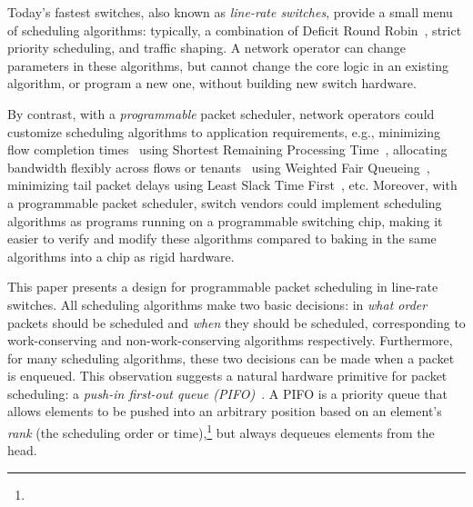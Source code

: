 
Today's fastest switches, also known as \textit{line-rate switches},
provide a small menu of scheduling algorithms: typically, a
combination of Deficit Round Robin~\cite{drr}, strict priority
scheduling, and traffic shaping. A network operator can change
parameters in these algorithms, but cannot change the core logic in an
existing algorithm, or program a new one, without building new switch
hardware.

By contrast, with a {\em programmable} packet scheduler, network
operators could customize scheduling algorithms to application
requirements, e.g., minimizing flow completion times~\cite{pFabric}
using Shortest Remaining Processing Time~\cite{srpt}, allocating
bandwidth flexibly across flows or tenants~\cite{eyeq, faircloud}
using Weighted Fair Queueing~\cite{wfq}, minimizing tail packet delays
using Least Slack Time First~\cite{lstf}, etc. Moreover, with a
programmable packet scheduler, switch vendors could implement
scheduling algorithms as programs running on a programmable switching
chip, making it easier to verify and modify these algorithms compared to
baking in the same algorithms into a chip as rigid hardware.

This paper presents a design for programmable packet scheduling in
line-rate switches. All scheduling algorithms make two basic
decisions: in {\em what order} packets should be scheduled and {\em
  when} they should be scheduled, corresponding to work-conserving
and non-work-conserving algorithms respectively.  Furthermore, for many scheduling
algorithms, these two decisions can be made when a packet is
enqueued. 
This observation suggests a natural hardware primitive for packet
scheduling: a {\em push-in first-out queue
  (PIFO)}~\cite{pifo}. A PIFO is a priority queue that
allows elements to be pushed into an arbitrary position based on an
element's {\em rank} (the scheduling order or time),\footnote{} but always dequeues elements from the head.


